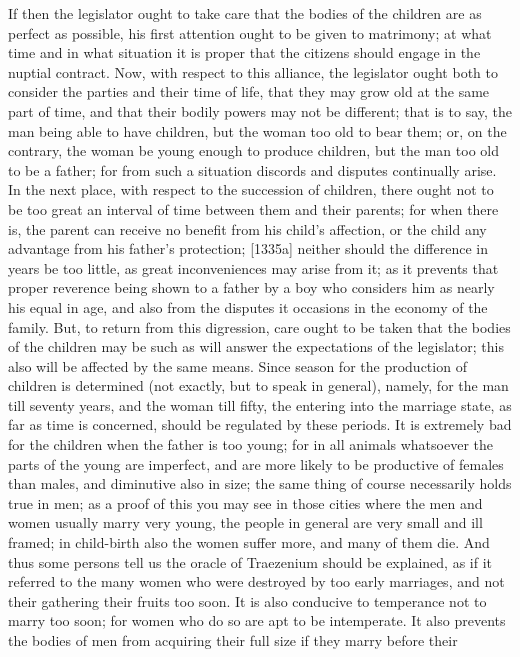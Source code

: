If then the legislator ought to take care that the bodies of the children
are as perfect as possible, his first attention ought to be given to
matrimony; at what time and in what situation it is proper that the
citizens should engage in the nuptial contract. Now, with respect to this
alliance, the legislator ought both to consider the parties and their time
of life, that they may grow old at the same part of time, and that their
bodily powers may not be different; that is to say, the man being able to
have children, but the woman too old to bear them; or, on the contrary,
the woman be young enough to produce children, but the man too old to be a
father; for from such a situation discords and disputes continually arise.
In the next place, with respect to the succession of children, there ought
not to be too great an interval of time between them and their parents;
for when there is, the parent can receive no benefit from his child's
affection, or the child any advantage from his father's protection;
[1335a] neither should the difference in years be too little, as great
inconveniences may arise from it; as it prevents that proper reverence
being shown to a father by a boy who considers him as nearly his equal in
age, and also from the disputes it occasions in the economy of the family.
But, to return from this digression, care ought to be taken that the
bodies of the children may be such as will answer the expectations of the
legislator; this also will be affected by the same means. Since season for
the production of children is determined (not exactly, but to speak in
general), namely, for the man till seventy years, and the woman till
fifty, the entering into the marriage state, as far as time is concerned,
should be regulated by these periods. It is extremely bad for the children
when the father is too young; for in all animals whatsoever the parts of
the young are imperfect, and are more likely to be productive of females
than males, and diminutive also in size; the same thing of course
necessarily holds true in men; as a proof of this you may see in those
cities where the men and women usually marry very young, the people in
general are very small and ill framed; in child-birth also the women
suffer more, and many of them die. And thus some persons tell us the
oracle of Traezenium should be explained, as if it referred to the many
women who were destroyed by too early marriages, and not their gathering
their fruits too soon. It is also conducive to temperance not to marry too
soon; for women who do so are apt to be intemperate. It also prevents the
bodies of men from acquiring their full size if they marry before their

